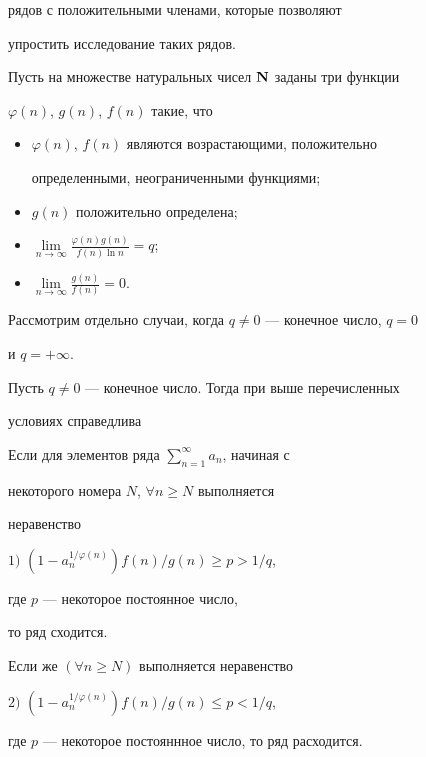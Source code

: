 рядов с положительными членами,  которые позволяют 


упростить исследование таких рядов.





Пусть на множестве натуральных чисел ${\bold N}$ заданы три функции


$\varphi (n)$, $g(n)$, $f(n)$ такие, что


\begin{itemize}


\item[1)] $\varphi (n)$, $f(n)$ являются возрастающими, положительно


определенными, неограниченными функциями;


\item[2)] $g(n)$ положительно определена;


\item[3)] 


$\lim\limits_{n \to \infty} \frac{\varphi (n)g(n)}{f(n)\ln n}=q$;


\item[4)] $\lim\limits_{n \to \infty}\frac{g(n)}{f(n)}=0$.


\end{itemize}





Рассмотрим отдельно случаи, когда $q \ne 0$ --- конечное число, $q=0$


и $q =+\infty $.





Пусть $q \ne 0$ --- конечное число. Тогда при выше перечисленных


условиях справедлива








\begin{thm}


Если для элементов ряда $\sum\limits_{n=1}^{\infty}a_n$, начиная с


некоторого номера $N$, $\forall n \geq N$ выполняется


неравенство





$1)$ $(1-a_n^{ 1/\varphi(n)})f(n)/g(n)\geq p >1/q$,


где $p$ --- некоторое постоянное число,


то ряд сходится.





Если же $(\forall n \geq N)$ выполняется неравенство





$2)$ $(1-a_n^{1/\varphi(n)})f(n)/g(n)\leq p <1/q$,


где $p$ --- некоторое постояннное число, то ряд расходится.


\end{thm}








